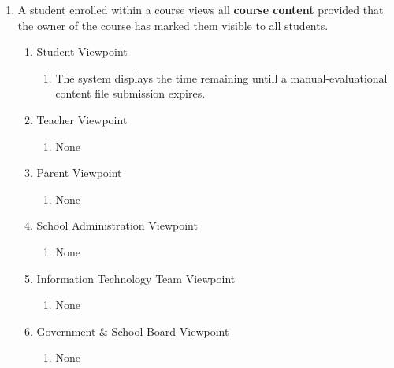 \documentclass[]{article}
\begin{document}
\begin{enumerate}[{BE}1.]
	\item A student enrolled within a course views all \textbf{course content} provided that the owner of the course has marked them visible to all students.
	\begin{enumerate}[{VP2}.1]
		\item Student Viewpoint
			\begin{enumerate}
				\item The system displays the time remaining untill a manual-evaluational content file submission expires.
			\end{enumerate}
		\item Teacher Viewpoint
			\begin{enumerate}
				\item None
			\end{enumerate}
		\item Parent Viewpoint
			\begin{enumerate}
				\item None
			\end{enumerate}
		\item School Administration Viewpoint
			\begin{enumerate}
				\item None
			\end{enumerate}
		\item Information Technology Team Viewpoint
			\begin{enumerate}
				\item None
			\end{enumerate}
		\item Government \& School Board Viewpoint
			\begin{enumerate}
				\item None
			\end{enumerate}
	\end{enumerate}



\end{enumerate}
\end{document}
